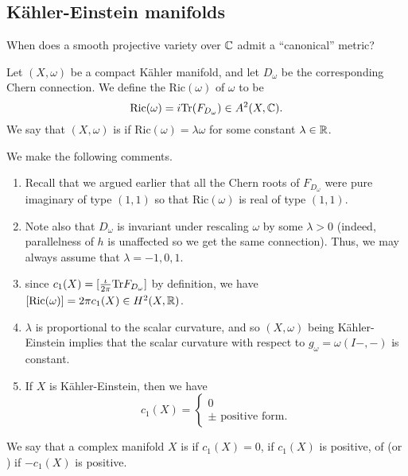\subsection{Kähler-Einstein manifolds}
\begin{question}
	When does a smooth projective variety over $\mathbb C$ admit a ``canonical'' metric?
\end{question}
\begin{definition}
	Let $(X,\omega)$ be a compact Kähler manifold, and let $D_\omega$ be the corresponding Chern connection. We define the  $\text{Ric}(\omega)$ of $\omega$ to be
	\[
	\text{Ric}(\omega)=i\text{Tr}(F_{D_\omega})\in A^2(X,\mathbb C).
	\]
	We say that $(X,\omega)$ is  if $\text{Ric}(\omega)=\lambda\omega$ for some constant $\lambda\in \mathbb R$. 
\end{definition}
\begin{remark} We make the following comments.
	\begin{enumerate}
		\item  Recall that we argued earlier that all the Chern roots of $F_{D_\omega}$ were pure imaginary of type $(1,1)$ so that $\text{Ric}(\omega)$ is real of type $(1,1)$. 
		
		\item Note also that $D_\omega$ is invariant under rescaling $\omega$ by some $\lambda>0$ (indeed, parallelness of $h$ is unaffected so we get the same connection). Thus, we may always assume that $\lambda=-1,0,1$.
		
		\item since $c_1(X)=[\frac{\iota}{2\pi}\text{Tr} F_{D_\omega}]$ by definition, we have $[\text{Ric}(\omega)]=2\pi c_1(X)\in H^2(X,\mathbb R)$.
		\item $\lambda$ is proportional to the scalar curvature, and so $(X,\omega)$ being Kähler-Einstein implies that the scalar curvature with respect to $g_\omega=\omega(I-,-)$ is constant.
		\item If $X$ is Kähler-Einstein, then we have
		\[
		c_1(X)=\begin{cases}
			0\\
			\pm\text{ positive form}.
		\end{cases}
		\]
	\end{enumerate}	
\end{remark}
\begin{definition}
	We say that a complex manifold $X$ is  if $c_1(X)=0$,  if $c_1(X)$ is positive, of  (or ) if $-c_1(X)$ is positive.
\end{definition}
